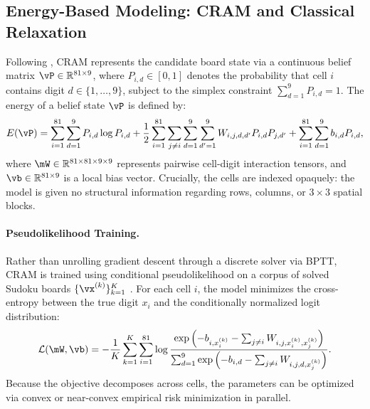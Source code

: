 \documentclass{article} %
\begin{document}
\subsection{Energy-Based Modeling: CRAM and Classical Relaxation}
Following \citet{hoover2026cram}, CRAM represents the candidate board state via a continuous belief matrix $\vP \in \mathbb{R}^{81 \times 9}$, where $P_{i, d} \in [0, 1]$ denotes the probability that cell $i$ contains digit $d \in \{1, \dots, 9\}$, subject to the simplex constraint $\sum_{d=1}^9 P_{i, d} = 1$. The energy of a belief state $\vP$ is defined by:
\begin{equation}
E(\vP) = \sum_{i=1}^{81} \sum_{d=1}^9 P_{i, d} \log P_{i, d} + \frac{1}{2} \sum_{i=1}^{81} \sum_{j \neq i} \sum_{d=1}^9 \sum_{d'=1}^9 W_{i, j, d, d'} P_{i, d} P_{j, d'} + \sum_{i=1}^{81} \sum_{d=1}^9 b_{i, d} P_{i, d},
\label{eq:cram_energy}
\end{equation}
where $\mW \in \mathbb{R}^{81 \times 81 \times 9 \times 9}$ represents pairwise cell-digit interaction tensors, and $\vb \in \mathbb{R}^{81 \times 9}$ is a local bias vector. Crucially, the cells are indexed opaquely: the model is given no structural information regarding rows, columns, or $3 \times 3$ spatial blocks.

\paragraph{Pseudolikelihood Training.}
Rather than unrolling gradient descent through a discrete solver via BPTT, CRAM is trained using conditional pseudolikelihood on a corpus of solved Sudoku boards $\{\vx^{(k)}\}_{k=1}^K$ \citep{besag1975statistical}. For each cell $i$, the model minimizes the cross-entropy between the true digit $x_i$ and the conditionally normalized logit distribution:
\begin{equation}
\mathcal{L}(\mW, \vb) = - \frac{1}{K} \sum_{k=1}^K \sum_{i=1}^{81} \log \frac{\exp \left( - b_{i, x_i^{(k)}} - \sum_{j \neq i} W_{i, j, x_i^{(k)}, x_j^{(k)}} \right)}{\sum_{d=1}^9 \exp \left( - b_{i, d} - \sum_{j \neq i} W_{i, j, d, x_j^{(k)}} \right)}.
\end{equation}
Because the objective decomposes across cells, the parameters can be optimized via convex or near-convex empirical risk minimization in parallel.
\end{document}
